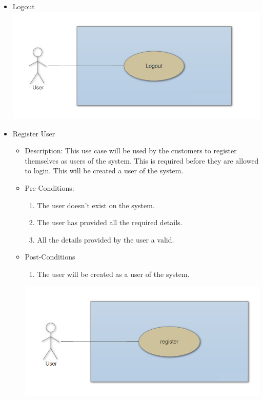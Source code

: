 \documentclass[a4paper,10pt]{article}
\begin{document}
\begin{enumerate}
\begin{itemize}
			\item Logout\\
			\includegraphics[scale=0.5]{Diagrams/logout.png}\\

			\item{Register User}
				\begin{itemize}
					\item Description:
				This use case will be used by the customers to register themselves as users of the system. This is required before they are allowed to login. 
				This will be created a user of the system.

					\item Pre-Conditions:
					\begin{enumerate}
						\item The user doesn't exist on the system.
						\item The user has provided all the required details.
						\item All the details provided by the user a valid. 
					\end{enumerate}
					\item Post-Conditions
					\begin{enumerate}
						\item The user will be created as a user of the system.
					\end{enumerate}
	 \includegraphics[scale=0.62]{Diagrams/RegisterUseCase.png}\\
				\end{itemize}



\end{itemize}
\end{enumerate}
\end{document}
